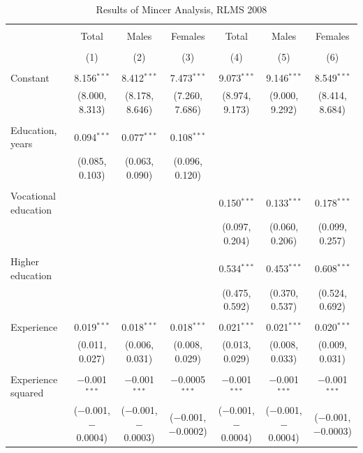\documentclass[12pt,a4paper]{article}
\numberwithin{equation}{section}
\begin{document}
\begin{landscape}
	
	\fontsize{9}{11}
	\selectfont
	
	\begin{table}[!htbp] \centering 
		\caption{Results of Mincer Analysis, RLMS 2008} 
		\label{} 
		\begin{tabular}{@{\extracolsep{5pt}}lcccccc} 
			\\[-1.8ex]\hline 
			\hline \\[-1.8ex] 
			& Total & Males & Females & Total & Males & Females \\ 
			\\[-1.8ex] & (1) & (2) & (3) & (4) & (5) & (6)\\ 
			\hline \\[-1.8ex] 
			Constant & 8.156$^{***}$ & 8.412$^{***}$ & 7.473$^{***}$ & 9.073$^{***}$ & 9.146$^{***}$ & 8.549$^{***}$ \\ 
			& (8.000, 8.313) & (8.178, 8.646) & (7.260, 7.686) & (8.974, 9.173) & (9.000, 9.292) & (8.414, 8.684) \\ 
			& & & & & & \\ 
			Education, years & 0.094$^{***}$ & 0.077$^{***}$ & 0.108$^{***}$ &  &  &  \\ 
			& (0.085, 0.103) & (0.063, 0.090) & (0.096, 0.120) &  &  &  \\ 
			& & & & & & \\ 
			Vocational education &  &  &  & 0.150$^{***}$ & 0.133$^{***}$ & 0.178$^{***}$ \\ 
			&  &  &  & (0.097, 0.204) & (0.060, 0.206) & (0.099, 0.257) \\ 
			& & & & & & \\ 
			Higher education &  &  &  & 0.534$^{***}$ & 0.453$^{***}$ & 0.608$^{***}$ \\ 
			&  &  &  & (0.475, 0.592) & (0.370, 0.537) & (0.524, 0.692) \\ 
			& & & & & & \\ 
			Experience & 0.019$^{***}$ & 0.018$^{***}$ & 0.018$^{***}$ & 0.021$^{***}$ & 0.021$^{***}$ & 0.020$^{***}$ \\ 
			& (0.011, 0.027) & (0.006, 0.031) & (0.008, 0.029) & (0.013, 0.029) & (0.008, 0.033) & (0.009, 0.031) \\ 
			& & & & & & \\ 
			Experience squared & $-$0.001$^{***}$ & $-$0.001$^{***}$ & $-$0.0005$^{***}$ & $-$0.001$^{***}$ & $-$0.001$^{***}$ & $-$0.001$^{***}$ \\ 
			& ($-$0.001, $-$0.0004) & ($-$0.001, $-$0.0003) & ($-$0.001, $-$0.0002) & ($-$0.001, $-$0.0004) & ($-$0.001, $-$0.0004) & ($-$0.001, $-$0.0003) \\ 

\end{tabular}
\end{table}
\end{landscape}
\end{document}
